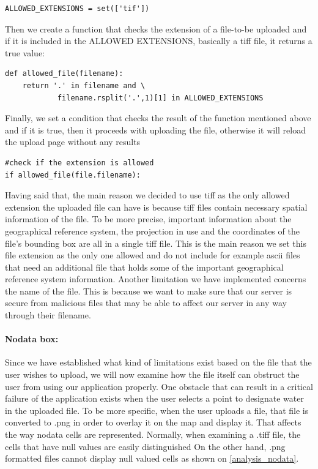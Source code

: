 \begin{lstlisting}
ALLOWED_EXTENSIONS = set(['tif'])
\end{lstlisting}

Then we create a function that checks the extension of a file-to-be uploaded and if it is included in the ALLOWED EXTENSIONS, basically a tiff file, it returns a true  value:

\begin{lstlisting}
def allowed_file(filename):
	return '.' in filename and \
			filename.rsplit('.',1)[1] in ALLOWED_EXTENSIONS
\end{lstlisting}

Finally, we set a condition that checks the result of the function mentioned above and if it is true, then it proceeds with uploading the file, otherwise it will reload the upload page without any results

\begin{lstlisting}
#check if the extension is allowed
if allowed_file(file.filename):
\end{lstlisting}

Having said that, the main reason we decided to use tiff as the only allowed extension the uploaded file can have is because tiff files contain necessary spatial information of the file. To be more precise, important information about the geographical reference system, the projection in use and the coordinates of the file's bounding box are all in a single tiff file. This is the main reason we set this file extension as the only one allowed and do not include for example ascii files that need an additional file that holds some of the important geographical reference system information.
Another limitation we have implemented concerns the name of the file. This is because we want to make sure that  our server is secure from malicious files that may be able to affect our server in any way through their filename.

\paragraph{Nodata box:} Since we have established what kind of limitations exist based on the file that the user wishes to upload, we will now examine how the file itself can obstruct the user from using our application properly. 
One obstacle that can result in a critical failure of the application exists when the user selects a point to designate water in the uploaded file. To be more specific, when the user uploads a file, that file is converted to .png in order to overlay it on the map and display it. That affects the way nodata cells are represented. Normally, when examining a .tiff file, the cells that have null values are easily distinguished
On the other hand, .png formatted files cannot display null valued cells as shown on \autoref{analysis_nodata}.

